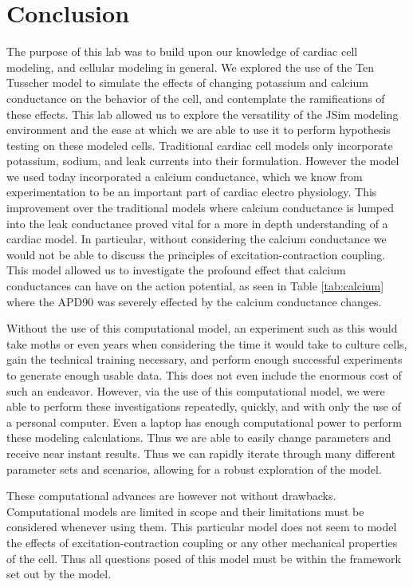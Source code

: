 \documentclass[11pt]{article}
\begin{document}
\section{Conclusion}
The purpose of this lab was to build upon our knowledge of cardiac cell modeling, and cellular modeling in general. We explored the use of the Ten Tusscher\cite{TenTusscher2003} model to simulate the effects of changing potassium and calcium conductance on the behavior of the cell, and contemplate the ramifications of these effects. This lab allowed us to explore the versatility of the JSim modeling environment and the ease at which we are able to use it to perform hypothesis testing on these modeled cells. Traditional cardiac cell models only incorporate potassium, sodium, and leak currents into their formulation. However the model we used today incorporated a calcium conductance, which we know from experimentation to be an important part of cardiac electro physiology. This improvement over the traditional models where calcium conductance is lumped into the leak conductance proved vital for a more in depth understanding of a cardiac model. In particular, without considering the calcium conductance we would not be able to discuss the principles of excitation-contraction coupling. This model allowed us to investigate the profound effect that calcium conductances can have on the action potential, as seen in Table \ref{tab:calcium} where the APD90 was severely effected by the calcium conductance changes.
\par{}
Without the use of this computational model, an experiment such as this would take moths or even years when considering the time it would take to culture cells, gain the technical training necessary, and perform enough successful experiments to generate enough usable data. This does not even include the enormous cost of such an endeavor. However, via the use of this computational model, we were able to perform these investigations repeatedly, quickly, and with only the use of a personal computer. Even a laptop has enough computational power to perform these modeling calculations. Thus we are able to easily change parameters and receive near instant results. Thus we can rapidly iterate through many different parameter sets and scenarios, allowing for a robust exploration of the model.
\par{}
These computational advances are however not without drawbacks. Computational models are limited in scope and their limitations must be considered whenever using them. This particular model does not seem to model the effects of excitation-contraction coupling or any other mechanical properties of the cell. Thus all questions posed of this model must be within the framework set out by the model.
\end{document}

